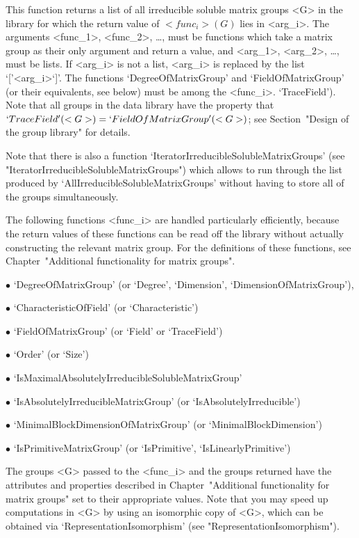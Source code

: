 This function returns a list of all irreducible soluble matrix
groups <G> in the {\IRREDSOL} library for which the return value of $<func_i>(G)$ lies in
<arg_i>.  The arguments <func_1>, <func_2>, \dots,
must be {\GAP} functions which take a matrix group as their only argument and
return a value, and <arg_1>, <arg_2>,
\dots,  must be lists. If <arg_i> is not a list, <arg_i> is replaced by the list
`['<arg_i>`]'. The functions `DegreeOfMatrixGroup' and `FieldOfMatrixGroup' (or their equivalents, see below) must be among the <func_i>. 
`TraceField'). Note that all groups in the data library have the property that 
$`TraceField'(<G>) = `FieldOfMatrixGroup'(<G>)$; see Section~"Design of the group library" 
for details. 

Note that there is also a function `IteratorIrreducibleSolubleMatrixGroups' (see
"IteratorIrreducibleSolubleMatrixGroups") which allows to run through the list produced by
`AllIrreducibleSolubleMatrixGroups' without having to store all of the groups
simultaneously.

The following functions <func_i> are handled particularly efficiently, because the
return values of these functions can be read off the
{\IRREDSOL} library without actually constructing the relevant matrix group. For the
definitions of these functions, see Chapter~"Additional functionality for matrix
groups".

\beginlist

\item{$\bullet$} `DegreeOfMatrixGroup' (or `Degree', `Dimension',
`DimensionOfMatrixGroup'), 
\item{$\bullet$} `CharacteristicOfField' (or `Characteristic')
\item{$\bullet$} `FieldOfMatrixGroup' (or `Field' or `TraceField')
\item{$\bullet$} `Order' (or `Size')
\item{$\bullet$} `IsMaximalAbsolutelyIrreducibleSolubleMatrixGroup' 
\item{$\bullet$} `IsAbsolutelyIrreducibleMatrixGroup' (or
`IsAbsolutelyIrreducible')
\item{$\bullet$} `MinimalBlockDimensionOfMatrixGroup' (or
`MinimalBlockDimension')
\item{$\bullet$} `IsPrimitiveMatrixGroup' (or `IsPrimitive',
`IsLinearlyPrimitive')

\endlist
The groups <G> passed to the <func_i> and the groups returned have the attributes and properties described in 
Chapter~"Additional functionality for matrix groups" set to their appropriate values.
Note that you may speed up computations in <G> by using an isomorphic copy of <G>, which can be obtained via `RepresentationIsomorphism' (see "RepresentationIsomorphism").

